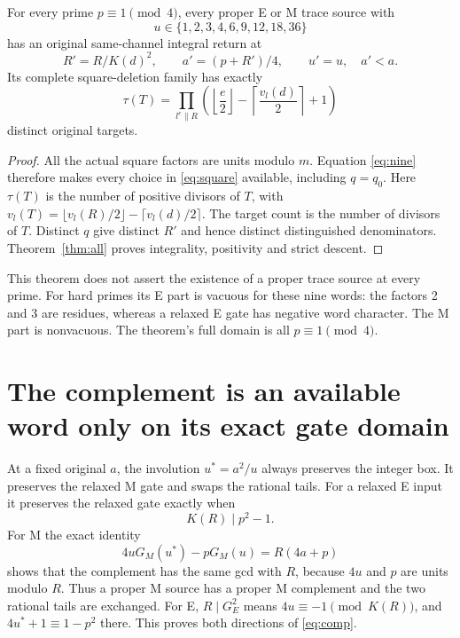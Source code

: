 \begin{theorem}\label{thm:safe}
For every prime $p\equiv1\pmod4$, every proper E or M trace source with
\[
 u\in\{1,2,3,4,6,9,12,18,36\}
\]
has an original same-channel integral return at
\begin{equation}\label{eq:auto}
 R'=R/K(d)^2,\qquad a'=(p+R')/4,\qquad u'=u,
 \quad a'<a.
\end{equation}
Its complete square-deletion family has exactly
\begin{equation}\label{eq:mult}
 \tau(T)=\prod_{l^e\parallel R}
 \left(\left\lfloor\frac e2\right\rfloor
       -\left\lceil\frac{v_l(d)}2\right\rceil+1\right)
\end{equation}
 distinct original targets.
\end{theorem}
\begin{proof}
All the actual square factors are units modulo $m$. Equation \eqref{eq:nine}
therefore makes every choice in \eqref{eq:square} available, including $q=q_0$.
Here $\tau(T)$ is the number of positive divisors of $T$, with
$v_l(T)=\lfloor v_l(R)/2\rfloor-\lceil v_l(d)/2\rceil$.
The target count is the number of divisors of $T$. Distinct $q$ give distinct
$R'$ and hence distinct distinguished denominators. Theorem~\ref{thm:all}
proves integrality, positivity and strict descent.
\end{proof}
This theorem does not assert the existence of a proper trace source at every
prime. For hard primes its E part is vacuous for these nine words: the factors
2 and 3 are residues, whereas a relaxed E gate has negative word character.
The M part is nonvacuous. The theorem's full domain is all $p\equiv1\pmod4$.

\section{The complement is an available word only on its exact gate domain}
At a fixed original $a$, the involution $u^*=a^2/u$ always preserves the integer
box. It preserves the relaxed M gate and swaps the rational tails.
For a relaxed E input it preserves the relaxed gate exactly when
\begin{equation}\label{eq:comp}
 K(R)\mid p^2-1.
\end{equation}
For M the exact identity
\[
 4uG_M(u^*)-pG_M(u)=R(4a+p)
\]
shows that the complement has the same gcd with $R$, because $4u$ and $p$ are
units modulo $R$.  Thus a proper M source has a proper M complement and the
two rational tails are exchanged.  For E, $R\mid G_E^2$ means
$4u\equiv-1\pmod{K(R)}$, and $4u^*+1\equiv1-p^2$ there. This proves both
directions of \eqref{eq:comp}.

